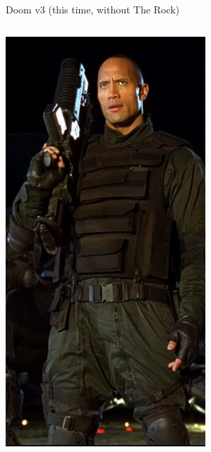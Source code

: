 \documentclass[presentation, t]{beamer}
\begin{document}
\begin{frame}[label={sec:orgbfeea96},fragile]{Doom v3 (this time, without The Rock)}
\begin{columns}
\begin{column}{0.3\columnwidth}
\begin{block}{}
\begin{center}
\includegraphics[width=\textwidth]{the_rock.png}
\end{center}
\end{block}
\end{column}
\end{columns}



\end{frame}
\end{document}
